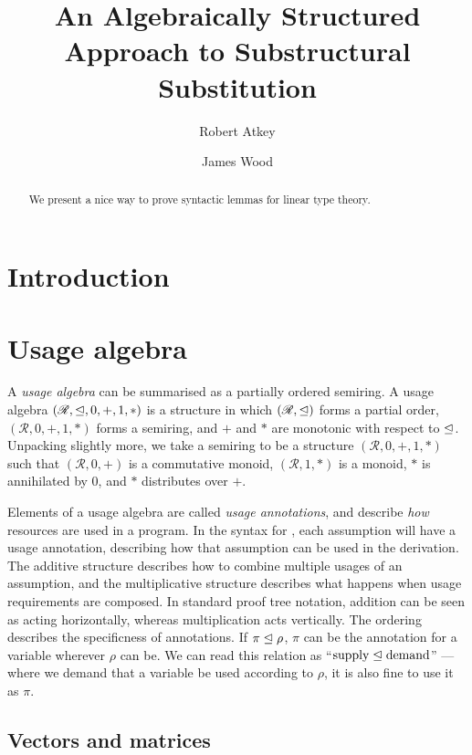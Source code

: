 \documentclass[submission,copyright,creativecommons]{eptcs}
\title{An Algebraically Structured Approach to Substructural Substitution}
\author{Robert Atkey
\institute{University of Strathclyde\\ Glasgow, United Kingdom}
\email{robert.atkey@strath.ac.uk}
\and
James Wood
\institute{University of Strathclyde\\ Glasgow, United Kingdom}
\email{james.wood.100@strath.ac.uk}
}
\begin{document}
\maketitle

\begin{abstract}
  We present a nice way to prove syntactic lemmas for linear type theory.
\end{abstract}

\section{Introduction}

\section{Usage algebra}

A \emph{usage algebra} can be summarised as a partially ordered semiring.
A usage algebra $(\mathscr R, \trianglelefteq, 0, +, 1, *)$ is a structure in which
$(\mathscr R, \trianglelefteq)$ forms a partial order, $(\mathscr R, 0, +, 1, *)$ forms
a semiring, and $+$ and $*$ are monotonic with respect to $\trianglelefteq$.
Unpacking slightly more, we take a semiring to be a structure
$(\mathscr R, 0, +, 1, *)$ such that $(\mathscr R, 0, +)$ is a commutative
monoid, $(\mathscr R, 1, *)$ is a monoid, $*$ is annihilated by $0$, and $*$
distributes over $+$.

Elements of a usage algebra are called \emph{usage annotations}, and describe
\emph{how} resources are used in a program.
In the syntax for \name, each assumption will have a usage annotation,
describing how that assumption can be used in the derivation.
The additive structure describes how to combine multiple usages of an
assumption, and the multiplicative structure describes what happens when usage
requirements are composed.
In standard proof tree notation, addition can be seen as acting horizontally,
whereas multiplication acts vertically.
The ordering describes the specificness of annotations.
If $\pi \trianglelefteq \rho$, $\pi$ can be the annotation for a variable wherever
$\rho$ can be.
We can read this relation as ``$\textrm{supply} \trianglelefteq \textrm{demand}$'' ---
where we demand that a variable be used according to $\rho$, it is also fine to
use it as $\pi$.

\subsection{Vectors and matrices}
\end{document}
